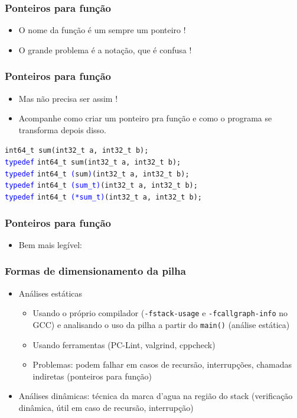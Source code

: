\documentclass{beamer}
\begin{document}
\begin{frame}
	\frametitle{Ponteiros para função}
	\begin{itemize}
		\item O nome da função é um sempre um ponteiro ! 
		\item O grande problema é a notação, que é confusa !
	\end{itemize}
		
\end{frame}

\begin{frame}
	\frametitle{Ponteiros para função}
	\begin{itemize}
		\item Mas não precisa ser assim ! 
		\item Acompanhe como criar um ponteiro pra função e como o programa se transforma depois disso.
	\end{itemize}	
	\vspace*{0.5cm}
\texttt{int64\_t sum(int32\_t a, int32\_t b);} \\
\texttt{\textcolor{blue}{typedef}} \texttt{int64\_t sum(int32\_t a, int32\_t b);} \\
\texttt{\textcolor{blue}{typedef}} \texttt{int64\_t \texttt{\textcolor{blue}{(}}sum\texttt{\textcolor{blue}{)}}(int32\_t a, int32\_t b);} \\
\texttt{\textcolor{blue}{typedef}} \texttt{int64\_t \texttt{\textcolor{blue}{(sum\_t)}}(int32\_t a, int32\_t b);} \\
\texttt{\textcolor{blue}{typedef}} \texttt{int64\_t \texttt{\textcolor{blue}{(*sum\_t)}}(int32\_t a, int32\_t b);} 
\end{frame}

\begin{frame}
	\frametitle{Ponteiros para função}
	\begin{itemize}
		\item Bem mais legível:
	\end{itemize}
		
\end{frame}

\begin{frame}
	\frametitle{Formas de dimensionamento da pilha}
	\begin{itemize}
		\item Análises estáticas
		\begin{itemize}
			\item Usando o próprio compilador (\texttt{-fstack-usage} e \texttt{-fcallgraph-info} no GCC) e analisando o uso da pilha a partir do \texttt{main()} (análise estática)
			\item Usando ferramentas (PC-Lint, valgrind, cppcheck)
			\item Problemas: podem falhar em casos de recursão, interrupções, chamadas indiretas (ponteiros para função)
		\end{itemize}
		\item Análises dinâmicas: técnica da marca d'agua na região do stack (verificação dinâmica, útil em caso de recursão, interrupção)
		\end{itemize}
\end{frame}
\end{document}
